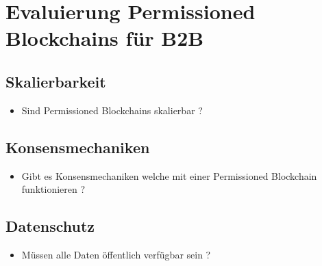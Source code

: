 \chapter{Evaluierung Permissioned Blockchains für B2B}
\label{cha:b2b-eval}

\section{Skalierbarkeit}
\begin{itemize}
    \item Sind Permissioned Blockchains skalierbar ?
\end{itemize}

\section{Konsensmechaniken}
\begin{itemize}
    \item Gibt es Konsensmechaniken welche mit einer Permissioned Blockchain funktionieren ?
\end{itemize}

\section{Datenschutz}
\begin{itemize}
    \item Müssen alle Daten öffentlich verfügbar sein ?
\end{itemize}


